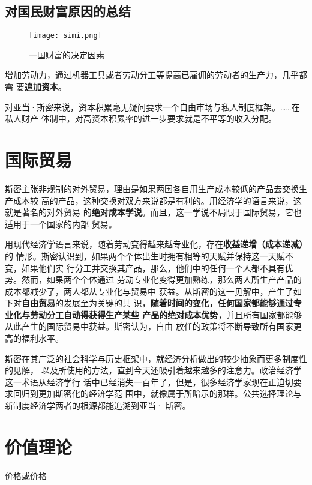 \subsection{对国民财富原因的总结}

\begin{figure}[ht]
  \centering
  \texttt{[image: simi.png]}
  \caption{\label{fig:simi}一国财富的决定因素 }
\end{figure}

增加劳动力，通过机器工具或者劳动分工等提高已雇佣的劳动者的生产力，几乎都需
要\textbf{追加资本}。

对亚当·斯密来说，资本积累毫无疑问要求一个自由市场与私人制度框架。……在私人财产
体制中，对高资本积累率的进一步要求就是不平等的收入分配。

\section{国际贸易}

斯密主张非规制的对外贸易，理由是如果两国各自用生产成本较低的产品去交换生产成本较
高的产品，这种交换对双方来说都是有利的。用经济学的语言来说，这就是著名的对外贸易
的\textbf{绝对成本学说}。而且，这一学说不局限于国际贸易，它也适用于一个国家的内部
贸易。

用现代经济学语言来说，随着劳动变得越来越专业化，存在\textbf{收益递增（成本递减）}的
情形。斯密认识到，如果两个个体出生时拥有相等的天赋并保持这一天赋不变，如果他们实
行分工并交换其产品，那么，他们中的任何一个人都不具有优势。然而，如果两个个体通过
劳动专业化变得更加熟练，那么两人所生产产品的成本都减少了，两人都从专业化与贸易中
获益。从斯密的这一见解中，产生了如下对\textbf{自由贸易}的发展至为关键的共
识，\textbf{随着时间的变化，任何国家都能够通过专业化与劳动分工自动得获得生产某些
  产品的绝对成本优势}，并且所有国家都能够从此产生的国际贸易中获益。斯密认为，自由
放任的政策将不断导致所有国家更高的福利水平。

斯密在其广泛的社会科学与历史框架中，就经济分析做出的较少抽象而更多制度性的见解，
以及所使用的方法，直到今天还吸引着越来越多的注意力。政治经济学这一术语从经济学行
话中已经消失一百年了，但是，很多经济学家现在正迫切要求回归到更加斯密化的经济学范
围中，就像属于所暗示的那样。公共选择理论与新制度经济学两者的根源都能追溯到亚当·
斯密。

\section{价值理论}

价格或价格

